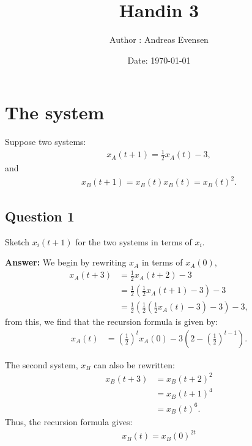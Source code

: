 \documentclass[a4paper]{article}
\title{Handin 3}
\author{Author : Andreas Evensen}
\date{Date: \today}
\newcommand{\newparagraph}{\vspace{.5cm}\noindent}
\begin{document}
\maketitle
\section*{The system}
Suppose two systems:
{\color{blue}
\begin{align*}
    x_A(t + 1) = \frac{1}{2}x_A(t) - 3,
\end{align*}
}and {\color{red}
\begin{align*}
    x_B(t+1) = x_B(t)x_B(t) = x_B(t)^2.
\end{align*}
}

\subsection*{Question 1}
Sketch $x_i(t + 1)$ for the two systems in terms of $x_i$.

\newparagraph
\textbf{Answer: }We begin by rewriting $x_A$ in terms of $x_A(0)$,
\begin{align*}
    x_A(t + 3) &= \frac{1}{2}x_A(t + 2) - 3\\
    &= \frac{1}{2}\left(\frac{1}{2}x_A(t + 1) - 3\right) - 3\\
    &= \frac{1}{2}\left(\frac{1}{2}\left(\frac{1}{2}x_A(t)- 3\right) - 3\right)-3,
\end{align*}from this, we find that the recursion formula is given by:
\begin{align*}
    x_A(t) &= \left(\frac{1}{2}\right)^t x_A(0) - 3\left(2 - \left(\frac{1}{2}\right)^{t-1}\right).
\end{align*}
\begin{figure}[H]
    \centering
\end{figure}The second system, $x_B$ can also be rewritten:
\begin{align*}
    x_B(t + 3) &= x_B(t + 2)^2\\
    &= x_B(t + 1)^4\\
    &= x_B(t)^6.
\end{align*}Thus, the recursion formula gives:
\begin{align*}
    x_B(t) = x_B(0)^{2t}
\end{align*}
\end{document}
